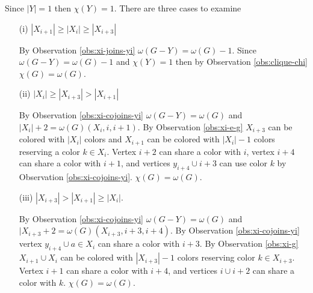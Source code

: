 \documentclass[12pt]{article}
\begin{document}
\begin{minipage}{0.5\textwidth}%
	 Since $|Y| = 1$ then $\chi(Y) = 1$. There are three cases to examine
	\begin{itemize}
		\item[(i)]
			$|X_{i+1}| \geq |X_i| \geq |X_{i+3}|$

			By Observation \ref{obs:xi-joins-yi} $\omega(G - Y) = \omega(G) - 1$. Since $\omega(G - Y) = \omega(G) - 1$ and $\chi(Y) = 1$ then by Observation \ref{obs:clique-chi} $\chi(G) = \omega(G)$.
		\item[(ii)]
			$|X_{i}| \geq |X_{i+3}| > |X_{i+1}|$
		
			By Observation \ref{obs:xi-cojoins-yi} $\omega(G - Y) = \omega(G)$ and $|X_i| + 2 = \omega(G) (X_i, i, i+1)$. By Observation \ref{obs:xi-e-g} $X_{i+3}$ can be colored with $|X_i|$ colors and $X_{i+1}$ can be colored with $|X_i| - 1$ colors reserving a color $k \in X_i$. Vertex $i+2$ can share a color with $i$, vertex $i+4$ can share a color with $i+1$, and vertices $y_{i+4} \cup i+3$ can use color $k$ by Observation \ref{obs:xi-cojoins-yi}. $\chi(G) = \omega(G)$.
		\item[(iii)]
			$|X_{i+3}| > |X_{i+1}| \geq |X_{i}|$.

			By Observation \ref{obs:xi-cojoins-yi} $\omega(G - Y) = \omega(G)$ and $|X_{i+3} + 2 =\omega(G) (X_{i+3}, i+3, i+4)$. By Observation \ref{obs:xi-cojoins-yi} vertex $y_{i+4} \cup a \in X_i$ can share a color with $i+3$. By Observation \ref{obs:xi-g} $X_{i+1} \cup X_{i}$ can be colored with $|X_{i+3}| - 1$ colors reserving color $k \in X_{i+3}$. Vertex $i+1$ can share a color with $i+4$, and vertices $i \cup i+2$ can share a color with $k$. $\chi(G) = \omega(G)$.
	\end{itemize}
\end{minipage}
\hfill
\end{document}

